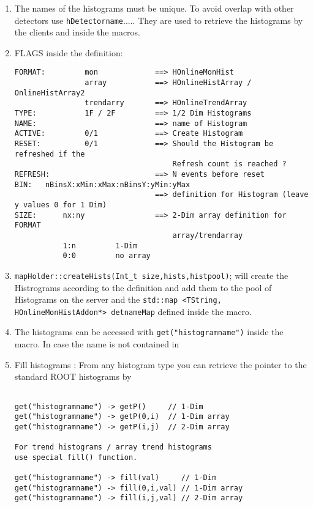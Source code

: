 \begin{enumerate}
  \begin{enumerate}
    \item The names of the histograms must be unique.
    To avoid overlap with other detectors use
    \verb+hDetectorname+..... 
    They are used to retrieve the histograms by the
    clients and inside the macros.
    \item FLAGS inside the definition:
\begin{lstlisting}         
FORMAT:         mon             ==> HOnlineMonHist
                array           ==> HOnlineHistArray / OnlineHistArray2
                trendarry       ==> HOnlineTrendArray
TYPE:           1F / 2F         ==> 1/2 Dim Histograms
NAME:                           ==> name of Histogram
ACTIVE:         0/1             ==> Create Histogram
RESET:          0/1             ==> Should the Histogram be refreshed if the 
                                    Refresh count is reached ?
REFRESH:                        ==> N events before reset 
BIN:   nBinsX:xMin:xMax:nBinsY:yMin:yMax
                                ==> definition for Histogram (leave y values 0 for 1 Dim)
SIZE:      nx:ny                ==> 2-Dim array definition for FORMAT 
                                    array/trendarray
           1:n         1-Dim
           0:0         no array
\end{lstlisting}         
    \item \verb+mapHolder::createHists(Int_t size,hists,histpool)+;
     will create the Histrograms according to the definition and add them to the 
     pool of Histograms on the server and the 
     \newline
     \verb+std::map <TString, HOnlineMonHistAddon*> detnameMap+
     defined inside the macro.
    \item The histograms can be accessed with \verb+get("histogramname")+
    inside the macro. In case the name is not contained in 
    \item Fill histograms : From any histogram type you can retrieve the
    pointer to the standard ROOT histograms by
\begin{lstlisting}         
                        
get("histogramname") -> getP()     // 1-Dim
get("histogramname") -> getP(0,i)  // 1-Dim array
get("histogramname") -> getP(i,j)  // 2-Dim array
                        
For trend histograms / array trend histograms
use special fill() function.
 
get("histogramname") -> fill(val)     // 1-Dim
get("histogramname") -> fill(0,i,val) // 1-Dim array
get("histogramname") -> fill(i,j,val) // 2-Dim array
\end{lstlisting}         
                      

\end{enumerate}
\end{enumerate}
